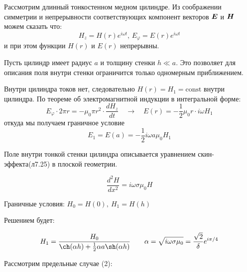 \documentclass{article}
\begin{document}
Рассмотрим длинный тонкостенном медном цилиндре. Из соображении симметрии и
непрерывности соответствующих компонент векторов $\vb*{E}$ и $\vb*{H}$ можем сказать что:
\begin{equation}
    H_z = H(r)e^{i\omega t} \text{, } E_\varphi = E(r)e^{i\omega t}
\end{equation}
и при этом функции $H(r)$ и $E(r)$ непрерывны.

Пусть цилиндр имеет радиус $a$ и толщину стенки $h \ll a$. Это позволяет для описания поля внутри стенки ограничится только одномерным приближением.

Внутри цилиндра токов нет, следовательно $H(r)=H_1=\text{const}$ внутри цилиндра.
По теореме об электромагнитной индукции в интегральной форме:
\begin{equation}
    E_{\varphi} \cdot 2 \pi r = - \mu_0 \pi r^2 \cdot \frac{dH_z}{dt} \quad \rightarrow \quad E(r) = -\frac{1}{2}\mu_0 r \cdot i \omega H_1
\end{equation}
откуда мы получаем граничное условие
\begin{equation}
    E_1=E(a)= -\frac{1}{2}i \omega a \mu_0 H_1
    \label{eq:granichnoe_uslovie_E}
\end{equation}

Поле внутри тонкой стенки цилиндра описывается уравнением скин-эффекта(л7.25) в плоской геометрии.

\begin{equation}
    \frac{d^2H}{dx^2} = i \omega \sigma \mu_0 H
\end{equation}

Граничные условия: $H_0 = H(0), \ H_1 = H(h)$

Решением будет:


\begin{equation}
    H_1 = \frac{H_0}{\ch(\alpha h) + \frac{1}{2} \alpha a \sh(\alpha h)} \quad \quad
    \alpha = \sqrt{i\omega \sigma \mu_0} = \frac{\sqrt{2}}{\delta}e^{i\pi/4}
    \label{eq:svyaz_poley}
\end{equation}

\vspace{4cm}
Рассмотрим предельные случае (2):
\end{document}
